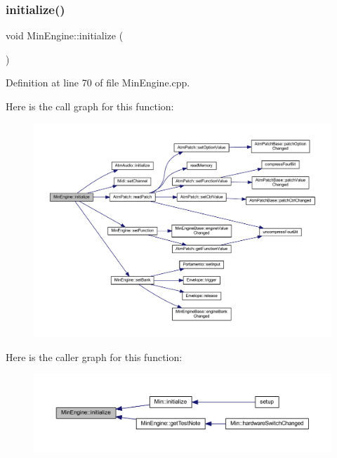 \subsubsection{\texorpdfstring{initialize()}{initialize()}}
{\footnotesize\ttfamily void Min\+Engine\+::initialize (\begin{DoxyParamCaption}{ }\end{DoxyParamCaption})}



Definition at line 70 of file Min\+Engine.\+cpp.

Here is the call graph for this function\+:
\nopagebreak
\begin{figure}[H]
\begin{center}
\leavevmode
\includegraphics[width=350pt]{d4/d0f/class_min_engine_ae59276976966cfd710288c1bbf1ea0cf_cgraph}
\end{center}
\end{figure}
Here is the caller graph for this function\+:
\nopagebreak
\begin{figure}[H]
\begin{center}
\leavevmode
\includegraphics[width=350pt]{d4/d0f/class_min_engine_ae59276976966cfd710288c1bbf1ea0cf_icgraph}
\end{center}
\end{figure}
\mbox{\label{class_min_engine_afd7005953daedf58d4332627e1592c07}} 
